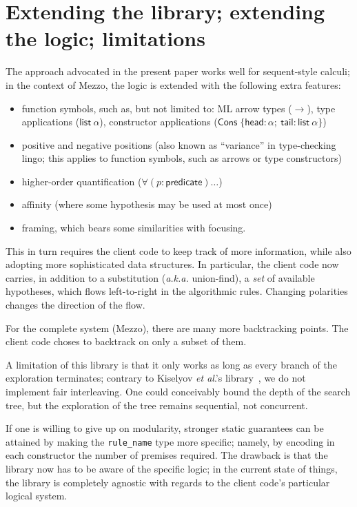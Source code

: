 \documentclass{easychair}
\def\li{\lstinline}
\begin{document}
\section{Extending the library; extending the logic; limitations}
\label{sec:extending}

The approach advocated in the present paper works well for sequent-style
calculi; in the context of Mezzo, the logic is extended with the following extra
features:
\begin{itemize}
  \item function symbols, such as, but not limited to: ML arrow types ($\to$),
    type applications ($\mathsf{list}\ \alpha$), constructor applications
    ($\mathsf{Cons}\;\{ \mathsf{head}:\alpha;\ \mathsf{tail}:\mathsf{list}\
    \alpha\}$)
  \item positive and negative positions (also known as ``variance'' in
    type-checking lingo; this applies to function symbols, such as arrows or
    type constructors)
  \item higher-order quantification ($\forall (p: \mathsf{predicate}) \ldots$)
  \item affinity (where some hypothesis may be used at most once)
  \item framing, which bears some similarities with focusing.
\end{itemize}

This in turn requires the client code to keep track of more information, while
also adopting more sophisticated data structures. In particular, the client code
now carries, in addition to a substitution (\emph{a.k.a.} union-find), a
\emph{set} of available hypotheses, which flows left-to-right in the algorithmic
rules. Changing polarities changes the direction of the flow.

For the complete system (Mezzo), there are many more backtracking points. The
client code choses to backtrack on only a subset of them.

A limitation of this library is that it only works as long as every branch of
the exploration terminates; contrary to Kiselyov \emph{et al}.'s
library~\cite{oleg05}, we do not implement fair interleaving. One could
conceivably bound the depth of the search tree, but the exploration of the tree
remains sequential, not concurrent.

If one is willing to give up on modularity, stronger static guarantees can be
attained by making the \li+rule_name+ type more specific; namely, by encoding in
each constructor the number of premises required. The drawback is that the
library now has to be aware of the specific logic; in the current state of
things, the library is completely agnostic with regards to the client code's
particular logical system.
\end{document}
